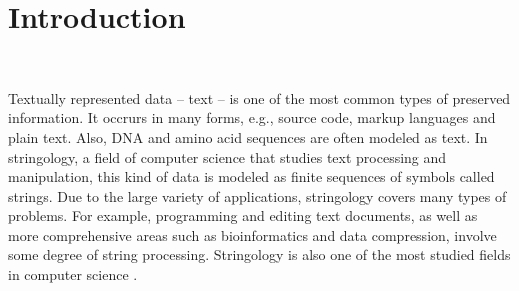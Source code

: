 \documentclass[english,twoside,censored,csm,algorithms-track-2020]{HYthesisML}
\theoremstyle{plain}
\theoremstyle{definition}
\numberwithin{testexample}{chapter}
\begin{document}
\mainmatter


%
%
%
%



\chapter{Introduction}~\label{chp-intro}


Textually represented data -- text -- is one of the most common types of preserved information.
It occrurs in many forms, e.g., source code, markup languages and plain text.
Also, DNA and amino acid sequences are often modeled as text.
In stringology, a field of computer science that studies text processing and manipulation,
this kind of data is modeled as finite sequences of symbols called strings.
Due to the large variety of applications, stringology covers many types of problems.
For example, programming and editing text documents, as well as more comprehensive areas such as
bioinformatics and data compression, involve some degree of string processing.
Stringology is also one of the most studied fields in computer science \citep{Crochemore03}.
\end{document}
